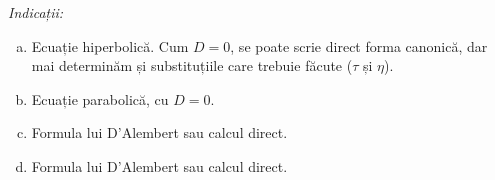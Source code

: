 \emph{Indicații:}
\begin{enumerate}[(a)]
    \item Ecuație hiperbolică. Cum $ D = 0 $, se poate scrie direct forma canonică, dar mai
        determinăm și substituțiile care trebuie făcute ($\tau$ și $\eta$).
    \item Ecuație parabolică, cu $ D = 0 $.
    \item Formula lui D'Alembert sau calcul direct.
    \item Formula lui D'Alembert sau calcul direct.
\end{enumerate}
